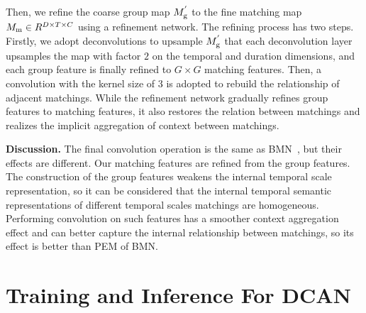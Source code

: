 \documentclass[letterpaper]{article} \usepackage{aaai22}  \usepackage{times}  \usepackage{helvet}  \usepackage{courier}  \usepackage[hyphens]{url}  \usepackage{graphicx} \urlstyle{rm} \def\UrlFont{\rm}  \usepackage{natbib}  \usepackage{caption} \DeclareCaptionStyle{ruled}{labelfont=normalfont,labelsep=colon,strut=off} \frenchspacing  \setlength{\pdfpagewidth}{8.5in}  \setlength{\pdfpageheight}{11in}  \usepackage{algorithm}
\begin{document}
Then, we refine the coarse group map $M_{\rm g}^{'}$ to the fine matching map $M_{\rm m} \in R^{ D \times T \times C}$ using a refinement network.
The refining process has two steps.
Firstly, we adopt deconvolutions to upsample $M_{\rm g}^{'}$ that each deconvolution layer upsamples the map with factor $2$ on the temporal and duration dimensions, and each group feature is finally refined to $G \times G $ matching features.
Then, a convolution with the kernel size of 3 is adopted to rebuild the relationship of adjacent matchings.
While the refinement network gradually refines group features to matching features, it also restores the relation between matchings and realizes the implicit aggregation of context between matchings.


\noindent\textbf{Discussion.}
The final convolution operation is the same as BMN~\cite{bmn}, but their effects are different.
Our matching features are refined from the group features. 
The construction of the group features weakens the internal temporal scale representation, so it can be considered that the internal temporal semantic representations of different temporal scales matchings are homogeneous.
Performing convolution on such features has a smoother context aggregation effect and can better capture the internal relationship between matchings, so its effect is better than PEM of BMN.





\section{Training and Inference For DCAN}
\end{document}
